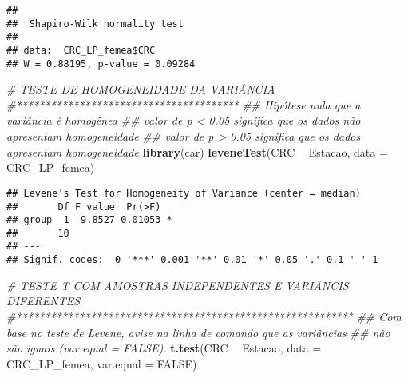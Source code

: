 \documentclass[
]{book}
\newenvironment{Shaded}{\begin{snugshade}}{\end{snugshade}}
\newcommand{\CommentTok}[1]{\textcolor[rgb]{0.56,0.35,0.01}{\textit{#1}}}
\newcommand{\DataTypeTok}[1]{\textcolor[rgb]{0.13,0.29,0.53}{#1}}
\newcommand{\KeywordTok}[1]{\textcolor[rgb]{0.13,0.29,0.53}{\textbf{#1}}}
\newcommand{\NormalTok}[1]{#1}
\newcommand{\OperatorTok}[1]{\textcolor[rgb]{0.81,0.36,0.00}{\textbf{#1}}}
\newcommand{\OtherTok}[1]{\textcolor[rgb]{0.56,0.35,0.01}{#1}}
\newcommand{\StringTok}[1]{\textcolor[rgb]{0.31,0.60,0.02}{#1}}
\begin{document}
\begin{Shaded}
\end{Shaded}

\begin{verbatim}
## 
## 	Shapiro-Wilk normality test
## 
## data:  CRC_LP_femea$CRC
## W = 0.88195, p-value = 0.09284
\end{verbatim}

\begin{Shaded}
\begin{Highlighting}[]
\CommentTok{# TESTE DE HOMOGENEIDADE DA VARIÂNCIA}
\CommentTok{#***************************************}
\CommentTok{## Hipótese nula que a variância é homogênea}
\CommentTok{## valor de p < 0.05 significa que os dados não apresentam homogeneidade}
\CommentTok{## valor de p > 0.05 significa que os dados apresentam homogeneidade}
\KeywordTok{library}\NormalTok{(car)}
\KeywordTok{leveneTest}\NormalTok{(CRC }\OperatorTok{~}\StringTok{ }\NormalTok{Estacao, }\DataTypeTok{data =}\NormalTok{ CRC_LP_femea)}
\end{Highlighting}
\end{Shaded}

\begin{verbatim}
## Levene's Test for Homogeneity of Variance (center = median)
##       Df F value  Pr(>F)  
## group  1  9.8527 0.01053 *
##       10                  
## ---
## Signif. codes:  0 '***' 0.001 '**' 0.01 '*' 0.05 '.' 0.1 ' ' 1
\end{verbatim}

\begin{Shaded}
\begin{Highlighting}[]
\CommentTok{# TESTE T COM AMOSTRAS INDEPENDENTES E VARIÂNCIS DIFERENTES}
\CommentTok{#***********************************************************}
\CommentTok{## Com base no teste de Levene, avise na linha de comando que as variâncias }
\CommentTok{## não são iguais (var.equal = FALSE).}
\KeywordTok{t.test}\NormalTok{(CRC }\OperatorTok{~}\StringTok{ }\NormalTok{Estacao, }\DataTypeTok{data =}\NormalTok{ CRC_LP_femea, }\DataTypeTok{var.equal =} \OtherTok{FALSE}\NormalTok{)}
\end{Highlighting}
\end{Shaded}
\end{document}
